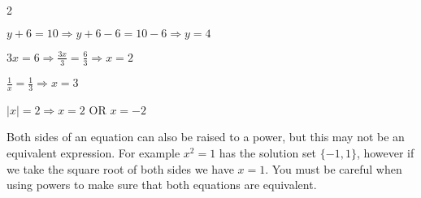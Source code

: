 \documentclass[crop=false,class=book,oneside]{standalone}
\begin{document}
            \begin{example}
                \
                \begin{enumerate}
                \end{enumerate}
            \end{example}
            Both sides of an equation can also be raised to a power,
            but this may not be an equivalent expression.
            For example $x^{2}=1$ has the solution set $\{-1,1\}$,
            however if we take the square root of both sides
            we have $x=1$. You must be careful when using
            powers to make sure that both equations are equivalent.
\end{document}
